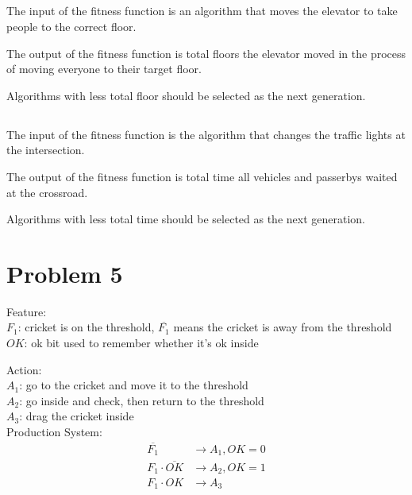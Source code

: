 \documentclass[paper=a4, fontsize=11pt]{scrartcl} %
\numberwithin{equation}{section} %
\numberwithin{figure}{section} %
\numberwithin{table}{section} %
\begin{document}
\subsection{}

The input of the fitness function is an algorithm that moves the elevator to take people to the correct floor.

The output of the fitness function is total floors the elevator moved in the process of moving everyone to their target floor.

Algorithms with less total floor should be selected as the next generation.

\subsection{}

The input of the fitness function is the algorithm that changes the traffic lights at the intersection.

The output of the fitness function is total time all vehicles and passerbys waited at the crossroad.

Algorithms with less total time should be selected as the next generation.



\section{Problem 5}

Feature:\\
$F_1$: cricket is on the threshold, $\overline{F_1}$ means the cricket is away from the threshold\\
$OK$: ok bit used to remember whether it's ok inside

Action:\\
$A_1$: go to the cricket and move it to the threshold\\
$A_2$: go inside and check, then return to the threshold\\
$A_3$: drag the cricket inside\\

Production System:\\
\begin{align*}
\overline{F_1} &\longrightarrow A_1, OK=0\\
F_1 \cdot \overline{OK} &\longrightarrow A_2, OK=1\\
F_1 \cdot OK &\longrightarrow A_3\\
\end{align*}



\end{document}
